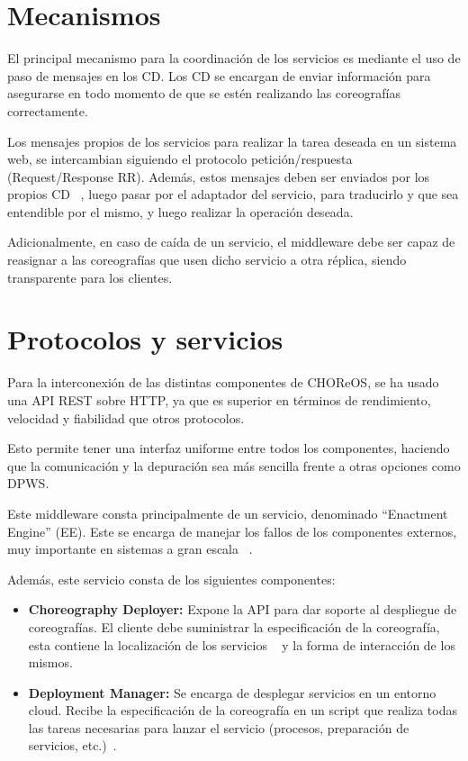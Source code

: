 \documentclass[runningheads]{llncs}
\begin{document}
\section{Mecanismos}
El principal mecanismo para la coordinación de los servicios es mediante el uso de paso de mensajes en los CD. Los CD se encargan de enviar información para asegurarse en todo momento de que se estén realizando las coreografías correctamente. 

Los mensajes propios de los servicios para realizar la tarea deseada en un sistema web, se intercambian siguiendo el protocolo petición/respuesta (Request/Response RR). Además, estos mensajes deben ser enviados por los propios CD ~\cite{a_2}, luego pasar por el adaptador del servicio, para traducirlo y que sea entendible por el mismo, y luego realizar la operación deseada.

Adicionalmente, en caso de caída de un servicio, el middleware debe ser capaz de reasignar a las coreografías que usen dicho servicio a otra réplica, siendo transparente para los clientes.
\section{Protocolos y servicios}
Para la interconexión de las distintas componentes de CHOReOS, se ha usado una API REST sobre HTTP, ya que es superior en términos de rendimiento, velocidad y fiabilidad que otros protocolos.~\cite{a_128}

Esto permite tener una interfaz uniforme entre todos los componentes, haciendo que la comunicación y la depuración sea más sencilla frente a otras opciones como DPWS. ~\cite{a_128}

Este middleware consta principalmente de un servicio, denominado ``Enactment Engine'' (EE). Este se encarga de manejar los fallos de los componentes externos, muy importante en sistemas a gran escala ~\cite{a_128}.

Además, este servicio consta de los siguientes componentes:

\begin{itemize}
    \item \textbf{Choreography Deployer: }Expone la API para dar soporte al despliegue de coreografías. El cliente debe suministrar la especificación de la coreografía, esta contiene la localización de los servicios ~\cite{a_128} y la forma de interacción de los mismos.
    \item \textbf{Deployment Manager: }Se encarga de desplegar servicios en un entorno cloud. Recibe la especificación de la coreografía en un script que realiza todas las tareas necesarias para lanzar el servicio (procesos, preparación de servicios, etc.)~\cite{a_128}.
\end{itemize}
\end{document}
